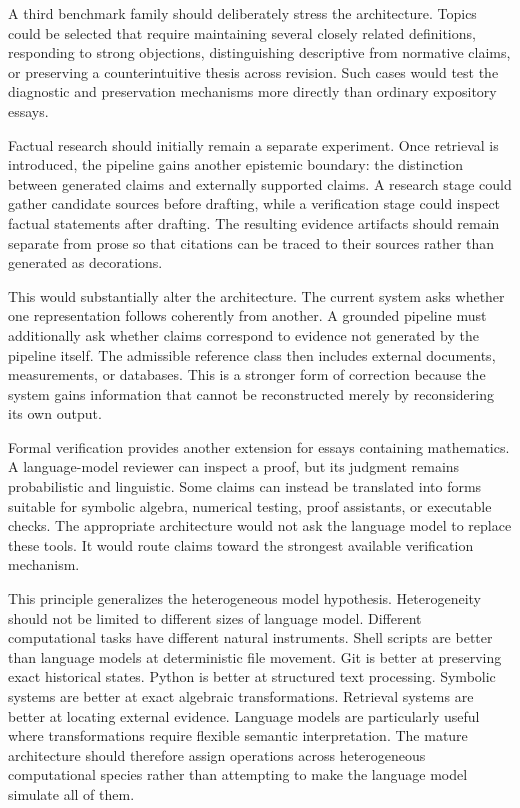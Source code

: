 \documentclass[11pt]{article}
\begin{document}
A third benchmark family should deliberately stress the architecture. Topics could be selected that require maintaining several closely related definitions, responding to strong objections, distinguishing descriptive from normative claims, or preserving a counterintuitive thesis across revision. Such cases would test the diagnostic and preservation mechanisms more directly than ordinary expository essays.

Factual research should initially remain a separate experiment. Once retrieval is introduced, the pipeline gains another epistemic boundary: the distinction between generated claims and externally supported claims. A research stage could gather candidate sources before drafting, while a verification stage could inspect factual statements after drafting. The resulting evidence artifacts should remain separate from prose so that citations can be traced to their sources rather than generated as decorations.

This would substantially alter the architecture. The current system asks whether one representation follows coherently from another. A grounded pipeline must additionally ask whether claims correspond to evidence not generated by the pipeline itself. The admissible reference class then includes external documents, measurements, or databases. This is a stronger form of correction because the system gains information that cannot be reconstructed merely by reconsidering its own output.

Formal verification provides another extension for essays containing mathematics. A language-model reviewer can inspect a proof, but its judgment remains probabilistic and linguistic. Some claims can instead be translated into forms suitable for symbolic algebra, numerical testing, proof assistants, or executable checks. The appropriate architecture would not ask the language model to replace these tools. It would route claims toward the strongest available verification mechanism.

This principle generalizes the heterogeneous model hypothesis. Heterogeneity should not be limited to different sizes of language model. Different computational tasks have different natural instruments. Shell scripts are better than language models at deterministic file movement. Git is better at preserving exact historical states. Python is better at structured text processing. Symbolic systems are better at exact algebraic transformations. Retrieval systems are better at locating external evidence. Language models are particularly useful where transformations require flexible semantic interpretation. The mature architecture should therefore assign operations across heterogeneous computational species rather than attempting to make the language model simulate all of them.
\end{document}
